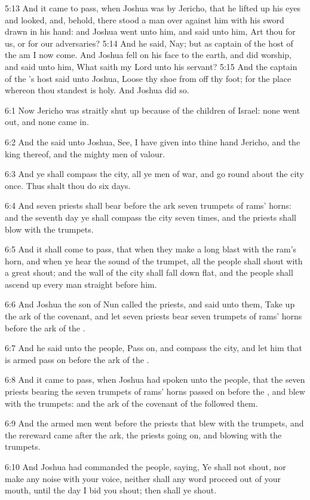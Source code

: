 5:13 And it came to pass, when Joshua was by Jericho, that he lifted
up his eyes and looked, and, behold, there stood a man over against
him with his sword drawn in his hand: and Joshua went unto him, and
said unto him, Art thou for us, or for our adversaries?  5:14 And he
said, Nay; but as captain of the host of the \LORD am I now come. And
Joshua fell on his face to the earth, and did worship, and said unto
him, What saith my Lord unto his servant?  5:15 And the captain of the
\LORD's host said unto Joshua, Loose thy shoe from off thy foot; for
the place whereon thou standest is holy. And Joshua did so.

6:1 Now Jericho was straitly shut up because of the children of
Israel: none went out, and none came in.

6:2 And the \LORD said unto Joshua, See, I have given into thine hand
Jericho, and the king thereof, and the mighty men of valour.

6:3 And ye shall compass the city, all ye men of war, and go round
about the city once. Thus shalt thou do six days.

6:4 And seven priests shall bear before the ark seven trumpets of
rams' horns: and the seventh day ye shall compass the city seven
times, and the priests shall blow with the trumpets.

6:5 And it shall come to pass, that when they make a long blast with
the ram's horn, and when ye hear the sound of the trumpet, all the
people shall shout with a great shout; and the wall of the city shall
fall down flat, and the people shall ascend up every man straight
before him.

6:6 And Joshua the son of Nun called the priests, and said unto them,
Take up the ark of the covenant, and let seven priests bear seven
trumpets of rams' horns before the ark of the \LORD.

6:7 And he said unto the people, Pass on, and compass the city, and
let him that is armed pass on before the ark of the \LORD.

6:8 And it came to pass, when Joshua had spoken unto the people, that
the seven priests bearing the seven trumpets of rams' horns passed on
before the \LORD, and blew with the trumpets: and the ark of the
covenant of the \LORD followed them.

6:9 And the armed men went before the priests that blew with the
trumpets, and the rereward came after the ark, the priests going on,
and blowing with the trumpets.

6:10 And Joshua had commanded the people, saying, Ye shall not shout,
nor make any noise with your voice, neither shall any word proceed out
of your mouth, until the day I bid you shout; then shall ye shout.

